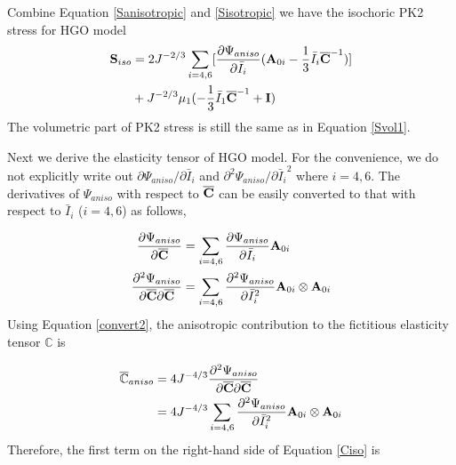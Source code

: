 Combine Equation \ref{Sanisotropic} and \ref{Sisotropic} we have the isochoric PK2 stress for HGO model
\begin{equation} \label{HGOSiso}
\begin{split}
\bold{S}_{iso} 
&= 
2J^{-2/3} \sum_{i = 4, 6}[\frac{\partial{\Psi_{aniso}}}{\partial{\bar{I}_i}}  (\bold{A}_{0i} - \frac{1}{3}\bar{I}_i\overline{\bold{C}}^{-1})] \\
&+  J^{-2/3}\mu_1(-\frac{1}{3}\bar{I}_1\overline{\bold{C}}^{-1} + \bold{I})
\end{split}
\end{equation}
The volumetric part of PK2 stress is still the same as in Equation \ref{Svol1}.



Next we derive the elasticity tensor of HGO model. For the convenience, we do not explicitly write out ${\partial\Psi_{aniso}}/{\partial{\bar{I}_i}}$ and $\partial^2{\Psi_{aniso}}/\partial{\bar{I}_i}^2$ where $i = 4, 6$. The derivatives of $\Psi_{aniso}$ with respect to $\overline{\bold{C}}$ can be easily converted to that with respect to $\bar{I}_{i}$ ($i = 4, 6$) as follows,

\begin{subequations} \label{convert}
\begin{align}
\frac{\partial\Psi_{aniso}}{\partial\overline{\bold{C}}} 
&= \sum_{i = 4, 6}\frac{\partial\Psi_{aniso}}{\partial\bar{I}_i}\bold{A}_{0i} \label{convert1} \\
\frac{\partial^2\Psi_{aniso}}{\partial{\overline{\bold{C}}}\partial{\overline{\bold{C}}}} 
&= \sum_{i = 4, 6}\frac{\partial^2\Psi_{aniso}}{\partial{\bar{I}_i}^2}\bold{A}_{0i} \otimes \bold{A}_{0i} \label{convert2}
\end{align}
\end{subequations}
Using Equation \ref{convert2}, the anisotropic contribution to the fictitious elasticity tensor $\mathbb{C}$ is

\begin{equation}
\begin{split}
\overline{\mathbb{C}}_{aniso} 
&= 4J^{-4/3}\frac{\partial^2\Psi_{aniso}}{\partial\overline{\bold{C}}\partial\overline{\bold{C}}} \\
&= 4J^{-4/3}\sum_{i = 4, 6}\frac{\partial^2\Psi_{aniso}}{\partial{\bar{I}_i}^2}\bold{A}_{0i} \otimes \bold{A}_{0i}
\end{split}
\end{equation}
Therefore, the first term on the right-hand side of Equation \ref{Ciso} is

